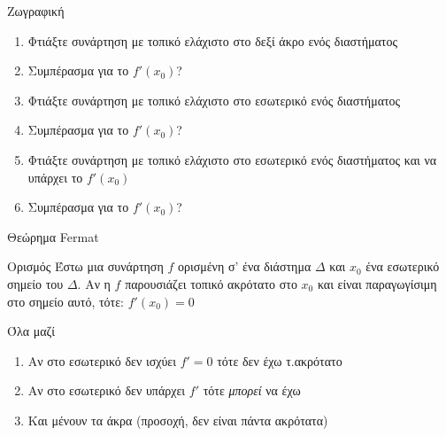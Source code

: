 \documentclass{presentation}
\begin{document}
\begin{frame}{Ζωγραφική}
  \begin{enumerate}
    \item<1-> Φτιάξτε συνάρτηση με τοπικό ελάχιστο στο δεξί άκρο ενός διαστήματος
    \item<2-> Συμπέρασμα για το $f'(x_0)$?
    \item<3-> Φτιάξτε συνάρτηση με τοπικό ελάχιστο στο εσωτερικό ενός διαστήματος
    \item<4-> Συμπέρασμα για το $f'(x_0)$?
    \item<5-> Φτιάξτε συνάρτηση με τοπικό ελάχιστο στο εσωτερικό ενός διαστήματος και να υπάρχει το $f'(x_0)$
    \item<6-> Συμπέρασμα για το $f'(x_0)$?
  \end{enumerate}
\end{frame}

\begin{frame}[label=Θεώρημα1]{Θεώρημα Fermat}
  \begin{block}{Ορισμός}
    Έστω μια συνάρτηση $f$ ορισμένη σ’ ένα διάστημα $Δ$ και $x_0$ ένα εσωτερικό σημείο του $Δ$. Αν η $f$ παρουσιάζει τοπικό ακρότατο στο $x_0$ και είναι παραγωγίσιμη στο σημείο αυτό, τότε:
    $f'(x_0) = 0$
  \end{block}

  \hyperlink{Απόδειξη1}{}
\end{frame}

\begin{frame}{Όλα μαζί}
  \begin{enumerate}
    \item<1-> Αν στο εσωτερικό δεν ισχύει $f'=0$ τότε δεν έχω τ.ακρότατο
    \item<2-> Αν στο εσωτερικό δεν υπάρχει $f'$ τότε \emph{μπορεί} να έχω
    \item<3-> Και μένουν τα άκρα (προσοχή, δεν είναι πάντα ακρότατα)
  \end{enumerate}
\end{frame}
\end{document}
